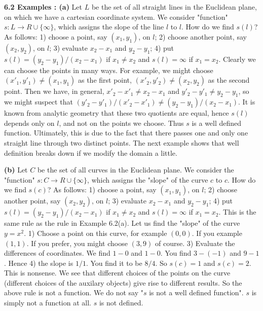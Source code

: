 \documentclass[11pt]{amsbook}
\begin{document}

\noindent
\textbf{6.2 Examples : (a)} Let $L$ be the set of all straight lines in the Euclidean plane, on which we have a cartesian coordinate system. We consider "function" $s:L \rightarrow R \cup \{ \infty \}$, which assigns the slope of the line $l$ to $l$. How do we find $s(l)$? As follows: 1) choose a point, say $(x_1, y_1)$, on $l$; 2) choose another point, say $(x_2, y_2)$, on $l$; 3) evaluate $x_2 - x_1$ and $y_2 - y_1$; 4) put $s(l) = (y_2 - y_1) / (x_2 - x_1)$ if $x_1 \neq x_2$ and $s(l) = \infty$ if $x_1 = x_2$. Clearly we can choose the points in many ways. For example, we might choose $(x'_1, y'_1) \neq (x_1, y_1)$ as the first point, $(x'_2, y'_2) \neq (x_2, y_2)$ as the second point. Then we have, in general, $x'_2 - x'_1 \neq x_2 - x_1$ and $y'_2 - y'_1 \neq y_2 - y_1$, so we might suspect that $(y'_2 - y'_1) / (x'_2 - x'_1) \neq (y_2 - y_1) / (x_2 - x_1)$. It is known from analytic geometry that these two quotients are equal, hence $s(l)$ depends only on $l$, and not on the points we choose. Thus $s$ is a well defined function. Ultimately, this is due to the fact that there passes one and only one straight line through two distinct points. The next example shows that well definition breaks down if we modify the domain a little. \\ \par

\noindent
\textbf{(b)} Let $C$ be the set of all curves in the Euclidean plane. We consider the "function" $s:C \rightarrow R \cup \{ \infty \}$, which assigns the "slope" of the curve $c$ to $c$. How do we find $s(c)$? As follows: 1) choose a point, say $(x_1, y_1)$, on $l$; 2) choose another point, say $(x_2, y_2)$, on $l$; 3) evaluate $x_2 - x_1$ and $y_2 - y_1$; 4) put $s(l) = (y_2 - y_1) / (x_2 - x_1)$ if $x_1 \neq x_2$ and $s(l) = \infty$ if $x_1 = x_2$. This is the same rule as the rule in Example 6.2(a). Let us find the "slope" of the curve $y = x^2$. 1) Choose a point on this curve, for example $(0,0)$. If you example $(1,1)$. If you prefer, you might choose $(3,9)$ of course. 3) Evaluate the differences of coordinates. We find  $1 - 0$ and $1 - 0$. You find $3 - (-1)$ and $9 - 1$. Hence 4) the slope is $1/1$. You find it to be $8/4$. So $s(c) = 1$ and $s(c) = 2$. This is nonsense. We see that different choices of the points on the curve (different choices of the auxilary objects) give rise to different results. So the above rule is not a function. We do not say "$s$ is not a well defined function". $s$ is simply not a function at all. $s$ is not defined.   \\ \par
\end{document}
